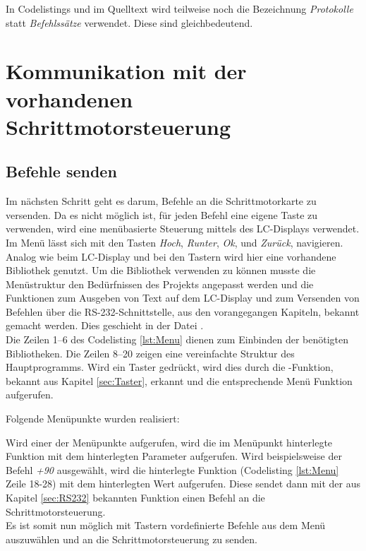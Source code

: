 In Codelistings und im Quelltext wird teilweise noch die Bezeichnung \emph{Protokolle} statt \emph{Befehlssätze} verwendet. Diese sind gleichbedeutend.
\lstset{language=C, basicstyle=\footnotesize, showstringspaces=false, tabsize=8}


\section{Kommunikation mit der vorhandenen Schrittmotorsteuerung}
\label{sec:Komm_SM}
\subsection{Befehle senden}
\label{sec:menu}
Im nächsten Schritt geht es darum, Befehle an die Schrittmotorkarte zu versenden. Da es nicht möglich ist, für jeden Befehl eine eigene Taste zu verwenden, 
wird eine menübasierte Steuerung mittels des LC-Displays verwendet. Im Menü lässt sich mit den Tasten \emph{Hoch}, \emph{Runter}, \emph{Ok}, und \emph{Zurück}, navigieren.\\
Analog wie beim LC-Display und bei den Tastern wird hier eine vorhandene Bibliothek genutzt. Um die Bibliothek verwenden zu können musste die Menüstruktur den Bedürfnissen des Projekts angepasst werden und die Funktionen zum Ausgeben von Text auf dem LC-Display und zum Versenden von Befehlen über die RS-232-Schnittstelle, aus den vorangegangen Kapiteln, bekannt gemacht werden. Dies geschieht in der Datei .\\
Die Zeilen 1--6 des Codelisting \ref{lst:Menu} dienen zum Einbinden der benötigten Bibliotheken. Die Zeilen 8--20 zeigen eine vereinfachte Struktur des Hauptprogramms. Wird ein Taster gedrückt, wird dies durch die -Funktion, bekannt aus Kapitel \ref{sec:Taster}, erkannt und die entsprechende Menü Funktion aufgerufen.
\lstset{language=C, basicstyle=\footnotesize, showstringspaces=false, tabsize=8}

Folgende Menüpunkte wurden realisiert:
\lstset{language=C, basicstyle=\footnotesize, showstringspaces=false, tabsize=8}

Wird einer der Menüpunkte aufgerufen, wird die im Menüpunkt hinterlegte Funktion mit dem hinterlegten Parameter aufgerufen. Wird beispielsweise der Befehl \emph{+90} ausgewählt, wird die hinterlegte Funktion (Codelisting \ref{lst:Menu} Zeile 18-28) mit dem hinterlegten Wert aufgerufen. Diese sendet dann mit der aus Kapitel \ref{sec:RS232} bekannten Funktion  einen Befehl an die Schrittmotorsteuerung.\\
Es ist somit nun möglich mit Tastern vordefinierte Befehle aus dem Menü auszuwählen und an die Schrittmotorsteuerung zu senden.
